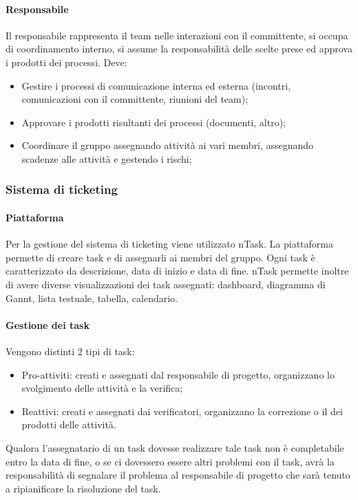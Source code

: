 \paragraph{Responsabile} \Spazio
Il responsabile rappresenta il team nelle interazioni con il committente, si occupa di coordinamento interno, si assume la responsabilità delle scelte prese ed approva i prodotti dei processi. Deve:
\begin{itemize}
\item Gestire i processi di comunicazione interna ed esterna (incontri, comunicazioni con il committente, riunioni del team);
\item Approvare i prodotti risultanti dei processi (documenti, altro);
\item Coordinare il gruppo assegnando attività ai vari membri, assegnando scadenze alle attività e gestendo i rischi;
\end{itemize}

\subsubsection{Sistema di ticketing}
\paragraph{Piattaforma} \Spazio
Per la gestione del sistema di ticketing viene utilizzato nTask. La piattaforma permette
di creare task e di assegnarli ai membri del gruppo. Ogni task è caratterizzato da
descrizione, data di inizio e data di fine. nTask permette inoltre di avere diverse visualizzazioni dei task assegnati: dashboard, diagramma di Gannt, lista testuale, tabella, calendario.

\paragraph{Gestione dei task} \Spazio
Vengono distinti 2 tipi di task:
\begin{itemize}
\item Pro-attiviti: creati e assegnati dal responsabile di progetto, organizzano lo svolgimento delle attività e la verifica;
\item Reattivi: creati e assegnati dai verificatori, organizzano la correzione o il  dei prodotti delle attività.
\end{itemize}
Qualora l'assegnatario di un task dovesse realizzare tale task non è completabile entro la data di fine, o se ci dovessero essere altri problemi con il task, avrà la responsabilità di segnalare il problema al responsabile di progetto che sarà tenuto a ripianificare la risoluzione del task.

